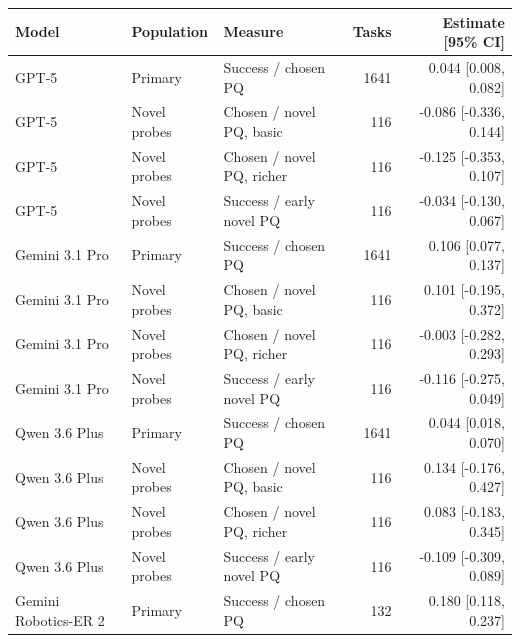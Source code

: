 \begin{tabular}{lllrr}
\toprule
Model & Population & Measure & Tasks & Estimate [95\% CI] \\
\midrule
GPT-5 & Primary & Success / chosen PQ & 1641 & 0.044 [0.008, 0.082] \\
GPT-5 & Novel probes & Chosen / novel PQ, basic & 116 & -0.086 [-0.336, 0.144] \\
GPT-5 & Novel probes & Chosen / novel PQ, richer & 116 & -0.125 [-0.353, 0.107] \\
GPT-5 & Novel probes & Success / early novel PQ & 116 & -0.034 [-0.130, 0.067] \\
Gemini 3.1 Pro & Primary & Success / chosen PQ & 1641 & 0.106 [0.077, 0.137] \\
Gemini 3.1 Pro & Novel probes & Chosen / novel PQ, basic & 116 & 0.101 [-0.195, 0.372] \\
Gemini 3.1 Pro & Novel probes & Chosen / novel PQ, richer & 116 & -0.003 [-0.282, 0.293] \\
Gemini 3.1 Pro & Novel probes & Success / early novel PQ & 116 & -0.116 [-0.275, 0.049] \\
Qwen 3.6 Plus & Primary & Success / chosen PQ & 1641 & 0.044 [0.018, 0.070] \\
Qwen 3.6 Plus & Novel probes & Chosen / novel PQ, basic & 116 & 0.134 [-0.176, 0.427] \\
Qwen 3.6 Plus & Novel probes & Chosen / novel PQ, richer & 116 & 0.083 [-0.183, 0.345] \\
Qwen 3.6 Plus & Novel probes & Success / early novel PQ & 116 & -0.109 [-0.309, 0.089] \\
Gemini Robotics-ER 2 & Primary & Success / chosen PQ & 132 & 0.180 [0.118, 0.237] \\
\bottomrule
\end{tabular}
